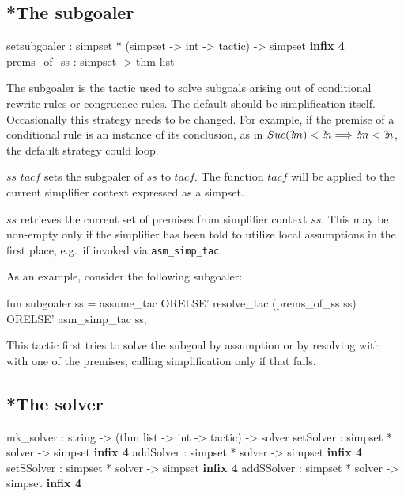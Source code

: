 \subsection{*The subgoaler}\label{sec:simp-subgoaler}
\begin{ttbox}
setsubgoaler :
  simpset *  (simpset -> int -> tactic) -> simpset \hfill{\bf infix 4}
prems_of_ss  : simpset -> thm list
\end{ttbox}

The subgoaler is the tactic used to solve subgoals arising out of
conditional rewrite rules or congruence rules.  The default should be
simplification itself.  Occasionally this strategy needs to be
changed.  For example, if the premise of a conditional rule is an
instance of its conclusion, as in $Suc({?\!m}) < {?\!n} \Longrightarrow {?\!m}
< {?\!n}$, the default strategy could loop.

\begin{ttdescription}
  
\item[$ss$ \ttindexbold{setsubgoaler} $tacf$] sets the subgoaler of
  $ss$ to $tacf$.  The function $tacf$ will be applied to the current
  simplifier context expressed as a simpset.
  
\item[\ttindexbold{prems_of_ss} $ss$] retrieves the current set of
  premises from simplifier context $ss$.  This may be non-empty only
  if the simplifier has been told to utilize local assumptions in the
  first place, e.g.\ if invoked via \texttt{asm_simp_tac}.

\end{ttdescription}

As an example, consider the following subgoaler:
\begin{ttbox}
fun subgoaler ss =
    assume_tac ORELSE'
    resolve_tac (prems_of_ss ss) ORELSE'
    asm_simp_tac ss;
\end{ttbox}
This tactic first tries to solve the subgoal by assumption or by
resolving with with one of the premises, calling simplification only
if that fails.


\subsection{*The solver}\label{sec:simp-solver}
\begin{ttbox}
mk_solver  : string -> (thm list -> int -> tactic) -> solver
setSolver  : simpset * solver -> simpset \hfill{\bf infix 4}
addSolver  : simpset * solver -> simpset \hfill{\bf infix 4}
setSSolver : simpset * solver -> simpset \hfill{\bf infix 4}
addSSolver : simpset * solver -> simpset \hfill{\bf infix 4}
\end{ttbox}

